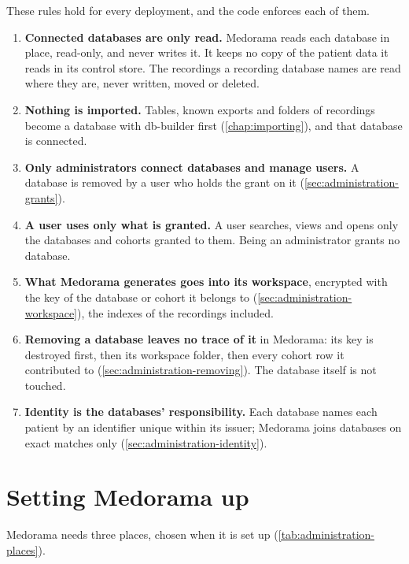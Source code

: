 These rules hold for every deployment, and the code enforces each of them.
\begin{enumerate}
\item \textbf{Connected databases are only read.} Medorama reads each database in place,
  read-only, and never writes it. It keeps no copy of the patient data it reads in its control
  store. The recordings a recording database names are read where they are, never written,
  moved or deleted.
\item \textbf{Nothing is imported.} Tables, known exports and folders of recordings become a
  database with db-builder first (\cref{chap:importing}), and that database is connected.
\item \textbf{Only administrators connect databases and manage users.} A database is removed
  by a user who holds the  grant on it (\cref{sec:administration-grants}).
\item \textbf{A user uses only what is granted.} A user searches, views and opens only the
  databases and cohorts granted to them. Being an administrator grants no database.
\item \textbf{What Medorama generates goes into its workspace}, encrypted with the key of the
  database or cohort it belongs to (\cref{sec:administration-workspace}), the indexes of the
  recordings included.
\item \textbf{Removing a database leaves no trace of it} in Medorama: its key is destroyed first,
  then its workspace folder, then every cohort row it contributed to
  (\cref{sec:administration-removing}). The database itself is not touched.
\item \textbf{Identity is the databases' responsibility.} Each database names each patient by an
  identifier unique within its issuer; Medorama joins databases on exact matches only
  (\cref{sec:administration-identity}).
\end{enumerate}

\section{Setting Medorama up}
\label{sec:administration-catalog}

Medorama needs three places, chosen when it is set up (\cref{tab:administration-places}).

